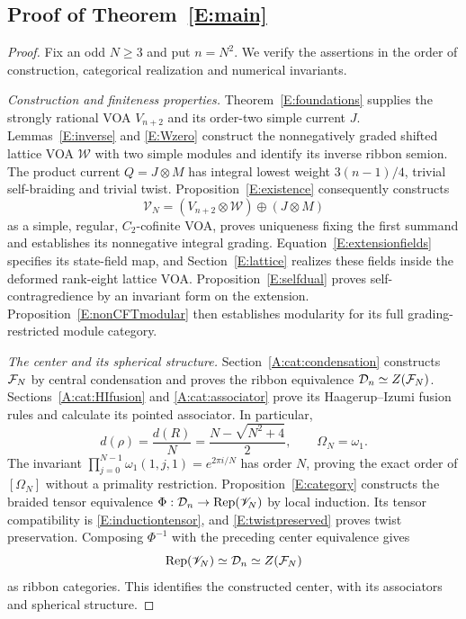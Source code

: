 \documentclass[11pt]{article}
\numberwithin{equation}{section}
\begin{document}
\subsection{Proof of Theorem~\ref{E:main}}\label{E:proof-main}
\begin{proof}
Fix an odd $N\geq3$ and put $n=N^2$. We verify the assertions in the order of construction, categorical realization and numerical invariants.

\emph{Construction and finiteness properties.} Theorem~\ref{E:foundations} supplies the strongly rational VOA $V_{n+2}$ and its order-two simple current $J$. Lemmas~\ref{E:inverse} and \ref{E:Wzero} construct the nonnegatively graded shifted lattice VOA $\mathcal W$ with two simple modules and identify its inverse ribbon semion. The product current $Q=J\otimes M$ has integral lowest weight $3(n-1)/4$, trivial self-braiding and trivial twist. Proposition~\ref{E:existence} consequently constructs
\[
\mathscr{V}_N=(V_{n+2}\otimes\mathcal W)\oplus(J\otimes M)
\]
as a simple, regular, $C_2$-cofinite VOA, proves uniqueness fixing the first summand and establishes its nonnegative integral grading. Equation~\eqref{E:extensionfields} specifies its state-field map, and Section~\ref{E:lattice} realizes these fields inside the deformed rank-eight lattice VOA. Proposition~\ref{E:selfdual} proves self-contragredience by an invariant form on the extension. Proposition~\ref{E:nonCFTmodular} then establishes modularity for its full grading-restricted module category.

\emph{The center and its spherical structure.} Section~\ref{A:cat:condensation} constructs $\mathcal F_N$ by central condensation and proves the ribbon equivalence $\mathcal D_n\simeq Z(\mathcal F_N)$. Sections~\ref{A:cat:HIfusion} and \ref{A:cat:associator} prove its Haagerup--Izumi fusion rules and calculate its pointed associator. In particular,
\[
d(\rho)=\frac{d(R)}N=\frac{N-\sqrt{N^2+4}}2,
\qquad \Omega_N=\omega_1.
\]
The invariant $\prod_{j=0}^{N-1}\omega_1(1,j,1)=e^{2\pi i/N}$ has order $N$, proving the exact order of $[\Omega_N]$ without a primality restriction. Proposition~\ref{E:category} constructs the braided tensor equivalence $\Phi:\mathcal D_n\to\operatorname{Rep}(\mathscr{V}_N)$ by local induction. Its tensor compatibility is \eqref{E:inductiontensor}, and \eqref{E:twistpreserved} proves twist preservation. Composing $\Phi^{-1}$ with the preceding center equivalence gives
\[
\operatorname{Rep}(\mathscr{V}_N)\simeq\mathcal D_n\simeq Z(\mathcal F_N)
\]
as ribbon categories. This identifies the constructed center, with its associators and spherical structure.


\end{proof}
\end{document}
